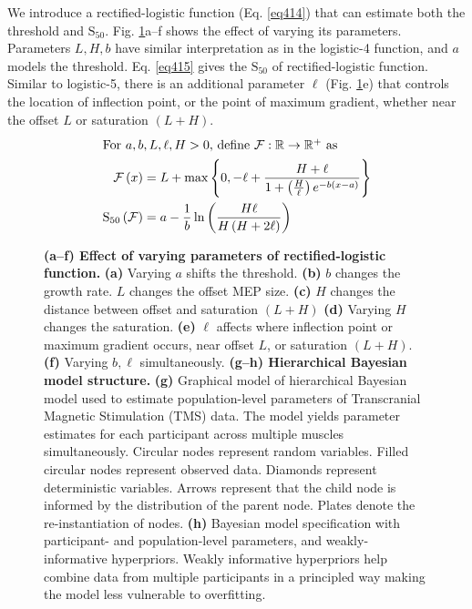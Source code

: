 \documentclass[sn-mathphys-ay]{sn-jnl}%
\theoremstyle{thmstyleone}%
\theoremstyle{thmstyletwo}%
\theoremstyle{thmstylethree}%
\begin{document}
We introduce a rectified-logistic function (Eq. \ref{eq414}) that can estimate both the threshold and $\text{S}_{50}$. Fig. \ref{fig-default}a--f shows the effect of varying its parameters. Parameters $L, H, b$ have similar interpretation as in the logistic-4 function, and $a$ models the threshold. Eq. \ref{eq415} gives the $\text{S}_{50}$ of rectified-logistic function. Similar to logistic-5, there is an additional parameter $\ell$ (Fig. \ref{fig-default}e) that controls the location of inflection point, or the point of maximum gradient, whether near the offset $L$ or saturation $\left(L + H\right)$.
\begin{align}
    \intertext{For $a, b, L, \ell, H > 0$, define $\mathcal{F}: \mathbb{R} \to \mathbb{R}^{+}$ as}
    \mathcal{F}\left(x\right) &= L + \max\left\{0, -\ell + \frac{H + \ell}{1 + \left(\frac{H}{\ell}\right)e^{-b\left(x-a\right)}} \right\} \label{eq414}\\
    {\text{S}_{50}}\left(\mathcal{F}\right)&= a - \frac1b\ln\left(\frac{H\ell}{H\left(H + 2\ell\right)}\right) \label{eq415}
\end{align}

\begin{figure}[h]
    \centering
    \caption{\textbf{(a--f) Effect of varying parameters of rectified-logistic function.} \textbf{(a)} Varying $a$ shifts the threshold. \textbf{(b)} $b$ changes the growth rate. $L$ changes the offset MEP size. \textbf{(c)} $H$ changes the distance between offset and saturation $\left(L + H\right)$ \textbf{(d)} Varying $H$ changes the saturation. \textbf{(e)} $\ell$ affects where inflection point or maximum gradient occurs, near offset $L$, or saturation $\left(L + H\right)$. \textbf{(f)} Varying $b, \ell$ simultaneously. \textbf{(g--h) Hierarchical Bayesian model structure.} \textbf{(g)} Graphical model of hierarchical Bayesian model used to estimate population-level parameters of Transcranial Magnetic Stimulation (TMS) data. The model yields parameter estimates for each participant across multiple muscles simultaneously. Circular nodes represent random variables. Filled circular nodes represent observed data. Diamonds represent deterministic variables. Arrows represent that the child node is informed by the distribution of the parent node. Plates denote the re-instantiation of nodes. \textbf{(h)} Bayesian model specification with participant- and population-level parameters, and weakly-informative hyperpriors. Weakly informative hyperpriors help combine data from multiple participants in a principled way making the model less vulnerable to overfitting.}\label{fig-default}
\end{figure}
\end{document}
